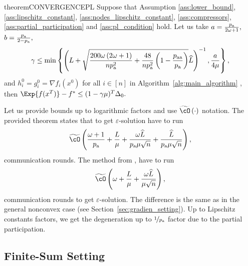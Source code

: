 \documentclass{article}
\newcommand{\algorithmname}{DASHA-PP}
\newcommand*{\probavailable}{\ensuremath{p_{\textnormal{a}}}}
\newcommand*{\probpairaa}{\ensuremath{p_{\textnormal{aa}}}}
\begin{document}
\begin{restatable}{theorem}{CONVERGENCEPL}
  \label{theorem:gradient_oracle_pl}
  Suppose that Assumption \ref{ass:lower_bound}, \ref{ass:lipschitz_constant}, \ref{ass:nodes_lipschitz_constant}, \ref{ass:compressors}, \ref{ass:partial_participation} and \ref{ass:pl_condition} hold. Let us take $a = \frac{\probavailable}{2 \omega + 1},$ $b = \frac{\probavailable}{2 - \probavailable},$ 
  $$\gamma \leq \min\left\{\left(L + \sqrt{\frac{200 \omega \left(2 \omega + 1\right)}{n \probavailable^2} + \frac{48}{n \probavailable^2}\left(1 - \frac{\probpairaa}{\probavailable}\right)}\widehat{L}\right)^{-1}, \frac{a}{4\mu}\right\}, $$ 
  and $h^{0}_i = g^{0}_i = \nabla f_i(x^0)$ for all $i \in [n]$ in Algorithm~\ref{alg:main_algorithm} \algname{(\algorithmname)},
  then $\Exp{f(x^{T})} - f^* \leq (1 - \gamma \mu)^{T} \Delta_0.$
\end{restatable}

Let us provide bounds up to logarithmic factors and use $\widetilde{\cO}\left(\cdot\right)$ notation. The provided theorem states that to get $\varepsilon$-solution \algname{\algorithmname} have to run
\begin{align*}
  \widetilde{\cO}\left(\frac{\omega + 1}{\probavailable} + \frac{L}{\mu} + \frac{\omega \widehat{L}}{\probavailable \mu \sqrt{n}} + \frac{\widehat{L}}{\probavailable \mu \sqrt{n}}\right),
\end{align*}
communication rounds. The method  from \citep{tyurin2022dasha}, have to run
\begin{align*}
  \widetilde{\cO}\left(\omega + \frac{L}{\mu} + \frac{\omega \widehat{L}}{\mu \sqrt{n}}\right),
\end{align*}
communication rounds to get $\varepsilon$-solution. The difference is the same as in the general nonconvex case (see Section~\ref{sec:gradien_setting}). Up to Lipschitz constants factors, we get the degeneration up to $\nicefrac{1}{\probavailable}$ factor due to the partial participation.

\subsection{Finite-Sum Setting}
\end{document}
